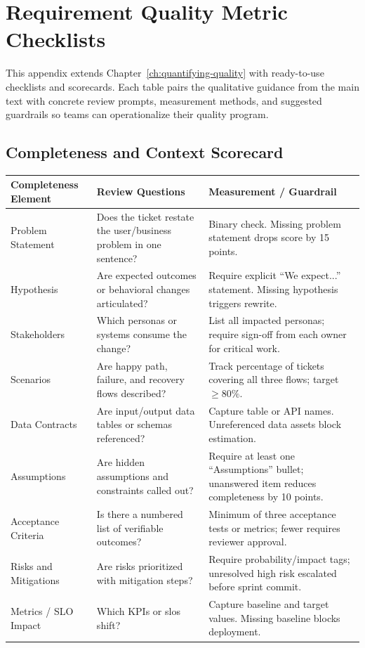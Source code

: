 \chapter{Requirement Quality Metric Checklists}
\label{appendix:metrics-checklists}

This appendix extends Chapter~\ref{ch:quantifying-quality} with ready-to-use checklists and scorecards. Each table pairs the qualitative guidance from the main text with concrete review prompts, measurement methods, and suggested guardrails so teams can operationalize their quality program.

\section{Completeness and Context Scorecard}
\begin{longtable}{p{}p{}p{}}
\toprule
\textbf{Completeness Element} & \textbf{Review Questions} & \textbf{Measurement / Guardrail}\\
\midrule
Problem Statement & Does the ticket restate the user/business problem in one sentence? & Binary check. Missing problem statement drops score by 15 points.\\
Hypothesis & Are expected outcomes or behavioral changes articulated? & Require explicit ``We expect...'' statement. Missing hypothesis triggers rewrite.\\
Stakeholders & Which personas or systems consume the change? & List all impacted personas; require sign-off from each owner for critical work.\\
Scenarios & Are happy path, failure, and recovery flows described? & Track percentage of tickets covering all three flows; target $\geq80\%$.\\
Data Contracts & Are input/output data tables or schemas referenced? & Capture table or API names. Unreferenced data assets block estimation.\\
Assumptions & Are hidden assumptions and constraints called out? & Require at least one ``Assumptions'' bullet; unanswered item reduces completeness by 10 points.\\
Acceptance Criteria & Is there a numbered list of verifiable outcomes? & Minimum of three acceptance tests or metrics; fewer requires reviewer approval.\\
Risks and Mitigations & Are risks prioritized with mitigation steps? & Require probability/impact tags; unresolved high risk escalated before sprint commit.\\
Metrics / SLO Impact & Which KPIs or \glspl{slo} shift? & Capture baseline and target values. Missing baseline blocks deployment.\\
\bottomrule
\end{longtable}

